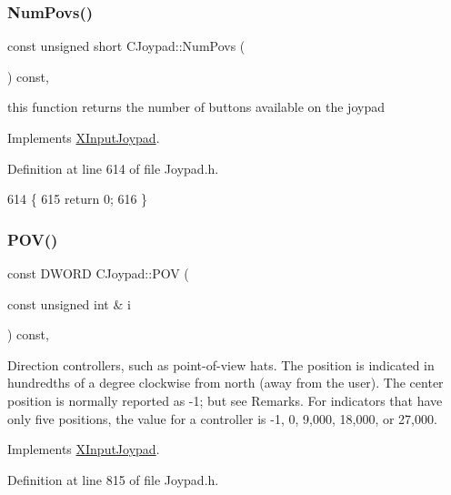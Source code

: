 \subsubsection{\texorpdfstring{Num\+Povs()}{NumPovs()}}
{\footnotesize\ttfamily const unsigned short C\+Joypad\+::\+Num\+Povs (\begin{DoxyParamCaption}{ }\end{DoxyParamCaption}) const\hspace{0.3cm}{\ttfamily [inline]}, {\ttfamily [virtual]}}

this function returns the number of buttons available on the joypad 

Implements \hyperlink{struct_x_input_joypad_a715b4a23b83fa39ca3940f4e2f45c852}{X\+Input\+Joypad}.



Definition at line 614 of file Joypad.\+h.


\begin{DoxyCode}
614                                          \{
615         \textcolor{keywordflow}{return} 0;
616     \}
\end{DoxyCode}
\mbox{\label{class_c_joypad_a52dad2bae4ae8ef1574d963bdd4c1a5d}} 
\subsubsection{\texorpdfstring{P\+O\+V()}{POV()}}
{\footnotesize\ttfamily const D\+W\+O\+RD C\+Joypad\+::\+P\+OV (\begin{DoxyParamCaption}\item[{const unsigned int \&}]{i }\end{DoxyParamCaption}) const\hspace{0.3cm}{\ttfamily [inline]}, {\ttfamily [virtual]}}

Direction controllers, such as point-\/of-\/view hats. The position is indicated in hundredths of a degree clockwise from north (away from the user). The center position is normally reported as -\/1; but see Remarks. For indicators that have only five positions, the value for a controller is -\/1, 0, 9,000, 18,000, or 27,000. 

Implements \hyperlink{struct_x_input_joypad_a2f270f296bcaf98089ab23f74a6e9937}{X\+Input\+Joypad}.



Definition at line 815 of file Joypad.\+h.



